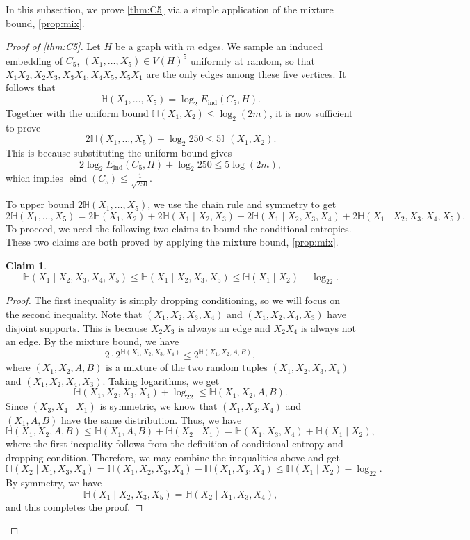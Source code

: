 \documentclass[reqno,11pt]{amsart}
\numberwithin{equation}{section}
\newtheorem{claim}[theorem]{Claim}
\theoremstyle{definition}
\theoremstyle{remark}
\DeclareMathOperator{\ind}{ind}
\DeclareMathOperator{\eind}{eind}
\newcommand{\HH}{\mathbb{H}}
\begin{document}
In this subsection, we prove \cref{thm:C5} via a simple application of the mixture bound, \cref{prop:mix}.
\begin{proof}[Proof of \cref{thm:C5}]

Let $H$ be a graph with $m$ edges. We sample an induced embedding of $C_5$, $(X_1,\dots,X_5)\in V(H)^5$ uniformly at random, so that $X_1X_2,X_2X_3,X_3X_4,X_4X_5,X_5X_1$ are the only edges among these five vertices. It follows that
\[\HH(X_1,\dots,X_5)=\log_2E_{\ind}(C_5,H).\]
Together with the uniform bound $\HH(X_1,X_2)\leq \log_2 (2m)$, it is now sufficient to prove 
\[
    2\HH(X_1,\dots,X_5)+\log_2 250\leq 5\HH(X_1,X_2).
\]
This is because substituting the uniform bound gives
\[2\log_2 E_{\ind}(C_5,H)+\log_2 250\leq 5\log (2m),\]
which implies $\eind(C_5)\leq \frac{1}{\sqrt{250}}$.



To upper bound $2\HH(X_1,\ldots, X_5)$, we use the chain rule and symmetry to get
\[2\HH(X_1,\dots,X_5)=2\HH(X_1,X_2)+2\HH(X_1\mid X_2,X_3)+2\HH(X_1\mid X_2,X_3,X_4)+2\HH(X_1\mid X_2,X_3,X_4,X_5).\]
To proceed, we need the following two claims to bound the conditional entropies. These two claims are both proved by applying the mixture bound, \cref{prop:mix}. 


\begin{claim}\label{claim:EntropyIneq2}
    \[\HH(X_1\mid X_2,X_3,X_4,X_5)\leq \HH(X_1\mid X_2,X_3,X_5)\leq \HH(X_1\mid X_2)-\log_22.\]
\end{claim}
\begin{proof}
    The first inequality is simply dropping conditioning, so we will focus on the second inequality.
    Note that $(X_1,X_2,X_3,X_4)$ and $(X_1,X_2,X_4,X_3)$ have disjoint supports. This is because $X_2X_3$ is always an edge and $X_2X_4$ is always not an edge. By the mixture bound, we have
    \[2\cdot 2^{\HH(X_1,X_2,X_3,X_4)}\leq 2^{\HH(X_1,X_2,A,B)},\]
    where $(X_1,X_2,A,B)$ is a mixture of the two random tuples $(X_1,X_2,X_3,X_4)$ and $(X_1,X_2,X_4,X_3)$. Taking logarithms, we get
    \[\HH(X_1,X_2,X_3,X_4)+\log_22\leq \HH(X_1,X_2,A,B).\]
    Since $(X_3,X_4\mid X_1)$ is symmetric, we know that $(X_1,X_3,X_4)$ and $(X_1,A,B)$ have the same distribution. Thus, we have 
    \[\HH(X_1,X_2,A,B)\leq \HH(X_1,A,B)+\HH(X_2\mid X_1)=\HH(X_1,X_3,X_4)+\HH(X_1\mid X_2),\]
    where the first inequality follows from the definition of conditional entropy and dropping condition.
    Therefore, we may combine the inequalities above and get
    \[\HH(X_2\mid X_1,X_3,X_4)=\HH(X_1,X_2,X_3,X_4)-\HH(X_1,X_3,X_4)\leq \HH(X_1\mid X_2)-\log_22.\]
    By symmetry, we have
    \[\HH(X_1\mid X_2,X_3,X_5)=\HH(X_2\mid X_1,X_3,X_4),\]
    and this completes the proof.
\end{proof}



\end{proof}
\end{document}
